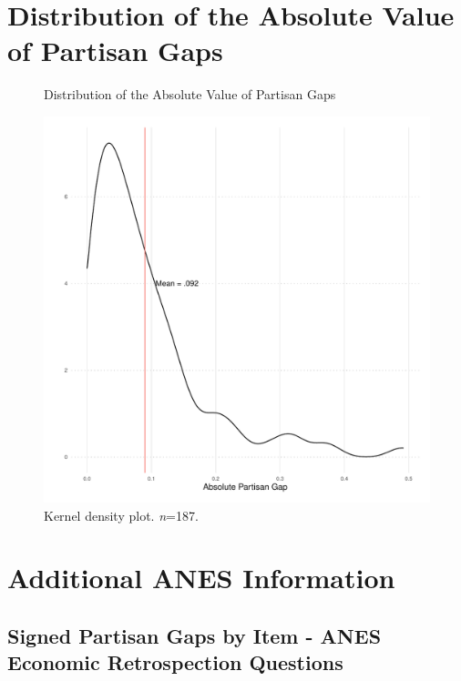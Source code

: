 \documentclass[12pt, letterpaper]{article}
\begin{document}
\clearpage

\section{Distribution of the Absolute Value of Partisan Gaps}

\begin{center}
\begin{figure}[H]
  \centering
  \caption{Distribution of the Absolute Value of Partisan Gaps \label{fig:abs_part_gap}}
  \includegraphics[scale=.8]{../figs/abs_value_p_gap.pdf}
   \caption*{Kernel density plot. \textit{n}=187.}
\end{figure}
\end{center}


\clearpage
\section{Additional ANES Information}

\subsection{Signed Partisan Gaps by Item - ANES Economic Retrospection Questions}
\label{append_econ}


\clearpage
\end{document}
